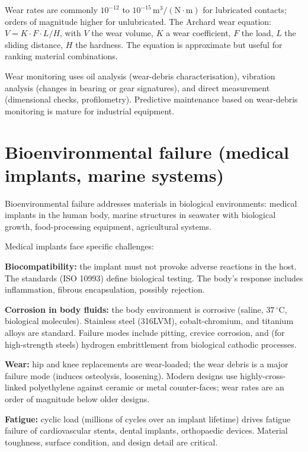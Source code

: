 Wear rates are commonly $10^{-12}$ to $10^{-15}\,\text{m}^3/(\text{N}\cdot\text{m})$ for lubricated contacts; orders of magnitude higher for unlubricated. The Archard wear equation: $V = K \cdot F \cdot L / H$, with $V$ the wear volume, $K$ a wear coefficient, $F$ the load, $L$ the sliding distance, $H$ the hardness. The equation is approximate but useful for ranking material combinations.

Wear monitoring uses oil analysis (wear-debris characterisation), vibration analysis (changes in bearing or gear signatures), and direct measurement (dimensional checks, profilometry). Predictive maintenance based on wear-debris monitoring is mature for industrial equipment.

\section{Bioenvironmental failure (medical implants, marine systems)}

Bioenvironmental failure addresses materials in biological environments: medical implants in the human body, marine structures in seawater with biological growth, food-processing equipment, agricultural systems.

Medical implants face specific challenges:

\textbf{Biocompatibility:} the implant must not provoke adverse reactions in the host. The standards (ISO 10993) define biological testing. The body's response includes inflammation, fibrous encapsulation, possibly rejection.

\textbf{Corrosion in body fluids:} the body environment is corrosive (saline, $37\,^\circ\text{C}$, biological molecules). Stainless steel (316LVM), cobalt-chromium, and titanium alloys are standard. Failure modes include pitting, crevice corrosion, and (for high-strength steels) hydrogen embrittlement from biological cathodic processes.

\textbf{Wear:} hip and knee replacements are wear-loaded; the wear debris is a major failure mode (induces osteolysis, loosening). Modern designs use highly-cross-linked polyethylene against ceramic or metal counter-faces; wear rates are an order of magnitude below older designs.

\textbf{Fatigue:} cyclic load (millions of cycles over an implant lifetime) drives fatigue failure of cardiovascular stents, dental implants, orthopaedic devices. Material toughness, surface condition, and design detail are critical.

